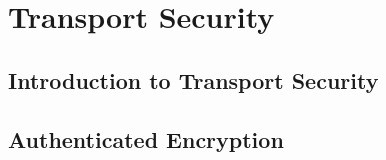 \documentclass[
letterpaper, %
oneside
]{tufte-book}
\begin{document}


\part{Transport Security}

\chapter{Introduction to Transport Security}



\chapter{Authenticated Encryption}




\backmatter



\end{document}
